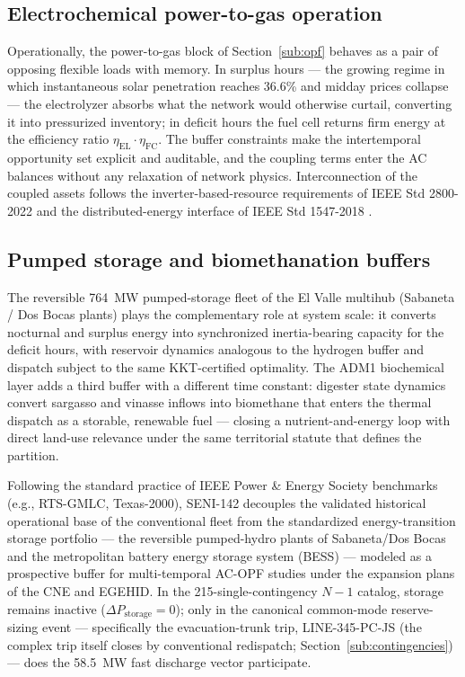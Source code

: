\subsection{Electrochemical power-to-gas operation}
\label{sub:p2g}

Operationally, the power-to-gas block of Section~\ref{sub:opf} behaves as a pair of opposing flexible loads with memory. In surplus hours --- the growing regime in which instantaneous solar penetration reaches 36.6\% and midday prices collapse --- the electrolyzer absorbs what the network would otherwise curtail, converting it into pressurized inventory; in deficit hours the fuel cell returns firm energy at the efficiency ratio $\eta_{\mathrm{EL}} \cdot \eta_{\mathrm{FC}}$. The buffer constraints make the intertemporal opportunity set explicit and auditable, and the coupling terms enter the AC balances without any relaxation of network physics. Interconnection of the coupled assets follows the inverter-based-resource requirements of IEEE Std 2800-2022 \cite{ieee2800} and the distributed-energy interface of IEEE Std 1547-2018 \cite{ieee1547}.

\subsection{Pumped storage and biomethanation buffers}
\label{sub:phes}

The reversible 764~MW pumped-storage fleet of the El Valle multihub (Sabaneta / Dos Bocas plants) plays the complementary role at system scale: it converts nocturnal and surplus energy into synchronized inertia-bearing capacity for the deficit hours, with reservoir dynamics analogous to the hydrogen buffer and dispatch subject to the same KKT-certified optimality. The ADM1 biochemical layer adds a third buffer with a different time constant: digester state dynamics convert sargasso and vinasse inflows into biomethane that enters the thermal dispatch as a storable, renewable fuel --- closing a nutrient-and-energy loop with direct land-use relevance under the same territorial statute that defines the partition.

Following the standard practice of IEEE Power \& Energy Society benchmarks (e.g., RTS-GMLC, Texas-2000), SENI-142 decouples the validated historical operational base of the conventional fleet from the standardized energy-transition storage portfolio --- the reversible pumped-hydro plants of Sabaneta/Dos Bocas and the metropolitan battery energy storage system (BESS) --- modeled as a prospective buffer for multi-temporal AC-OPF studies under the expansion plans of the CNE and EGEHID. In the 215-single-contingency $N-1$ catalog, storage remains inactive ($\Delta P_{\mathrm{storage}} = 0$); only in the canonical common-mode reserve-sizing event --- specifically the evacuation-trunk trip, LINE-345-PC-JS (the complex trip itself closes by conventional redispatch; Section~\ref{sub:contingencies}) --- does the 58.5~MW fast discharge vector participate.

